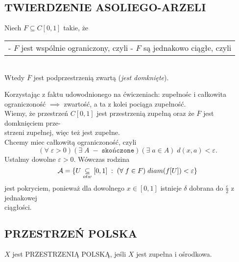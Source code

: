 \subsection{TWIERDZENIE ASOLIEGO-ARZELI}
\begin{center}\large
    Niech $F\subseteq C[0, 1]$ takie, że\smallskip\\
    \begin{tabular} { c }
        \makecell [l] {
            - $F$ jest wspólnie ograniczony, czyli\smallskip\\
            \indent{\normalsize$(\exists\;c>0) (\forall\;f\in F)(\forall\;x\in [0, 1])|f(x)|<c$}\smallskip\\
            - $F$ są jednakowo ciągłe, czyli\smallskip\\
            \indent{\normalsize$(\forall\;x)(\forall\;\varepsilon>0)(\exists\;\delta>0)(\forall\;f\in F)\;|x-y|<\delta\implies |f(x)-f(y)|<\varepsilon$} }
    \end{tabular}\medskip\\
    Wtedy $\overline F$ jest podprzestrzenią zwartą (\emph{jest domknięte}).
\end{center}
\dowod
Korzystając z faktu udowodnionego na ćwiczeniach: zupełnośc i całkowita ograniczoność $\implies$ zwartość, a ta z kolei pociąga zupełność.\bigskip\\
Wiemy, że przestrzeń $C[0, 1]$ jest przestrzenią zupełną oraz że $\overline F$ jest domknięciem prze-\\strzeni zupełnej, więc też jest zupełne.\smallskip\\
Chcemy miec całkowitą ograniczoność, czyli
$$(\forall\;\varepsilon>0)(\exists\;A\;-\;\texttt{skończone})(\exists\;a\in A)\;d(x, a)<\varepsilon.$$
Ustalmy dowolne $\varepsilon>0$. Wówczas rodzina
$$\mathcal{A}=\{U\underset{otw}\subseteq [0, 1]\;:\;(\forall\;f\in F)\;diam( f[U])<\varepsilon\}$$
jest pokryciem, ponieważ dla dowolnego $x\in [0, 1]$ istnieje $\delta$ dobrana do $\frac\varepsilon2$ z jednakowej \\ciągłości.

\subsection{PRZESTRZEŃ POLSKA}
\begin{center}\large
    $X$ jest {\color{def}PRZESTRZENIĄ POLSKĄ}, jeśli $X$ jest {\color{acc}zupełna} i {\color{acc}ośrodkowa}.
\end{center}